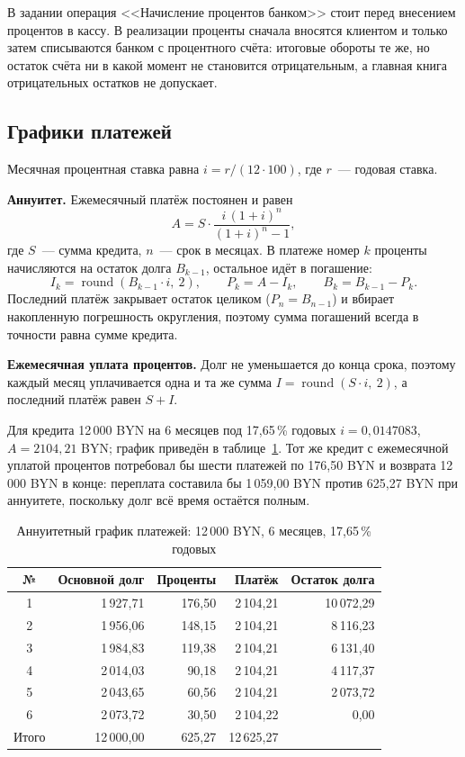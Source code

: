 \documentclass[14pt,a4paper]{extarticle}
\begin{document}
В задании операция <<Начисление процентов банком>> стоит перед внесением процентов в
кассу. В реализации проценты сначала вносятся клиентом и только затем списываются банком с
процентного счёта: итоговые обороты те же, но остаток счёта ни в какой момент не становится
отрицательным, а главная книга отрицательных остатков не допускает.

\subsection{Графики платежей}

Месячная процентная ставка равна $i = r / (12 \cdot 100)$, где $r$~--- годовая ставка.

\textbf{Аннуитет.} Ежемесячный платёж постоянен и равен
\begin{equation}
A = S \cdot \frac{i\,(1 + i)^n}{(1 + i)^n - 1},
\label{eq:annuity}
\end{equation}
где $S$~--- сумма кредита, $n$~--- срок в месяцах. В платеже номер $k$ проценты начисляются
на остаток долга $B_{k-1}$, остальное идёт в погашение:
\begin{equation}
I_k = \operatorname{round}(B_{k-1} \cdot i,\ 2), \qquad P_k = A - I_k, \qquad B_k = B_{k-1} - P_k .
\end{equation}
Последний платёж закрывает остаток целиком ($P_n = B_{n-1}$) и вбирает накопленную
погрешность округления, поэтому сумма погашений всегда в точности равна сумме кредита.

\textbf{Ежемесячная уплата процентов.} Долг не уменьшается до конца срока, поэтому каждый
месяц уплачивается одна и та же сумма $I = \operatorname{round}(S \cdot i,\ 2)$, а последний
платёж равен $S + I$.

Для кредита 12\,000 BYN на 6 месяцев под 17,65\,\% годовых $i = 0{,}0147083$,
$A = 2104{,}21$ BYN; график приведён в таблице~\ref{tab:schedule}. Тот же кредит с
ежемесячной уплатой процентов потребовал бы шести платежей по 176,50 BYN и возврата
12\,000 BYN в конце: переплата составила бы 1\,059,00 BYN против 625,27 BYN при аннуитете,
поскольку долг всё время остаётся полным.

\begin{table}[H]
\caption{Аннуитетный график платежей: 12\,000 BYN, 6 месяцев, 17,65\,\% годовых}
\label{tab:schedule}
\centering
\small
\begin{tabular}{crrrr}
\toprule
№ & Основной долг & Проценты & Платёж & Остаток долга \\
\midrule
1 & 1\,927,71 & 176,50 & 2\,104,21 & 10\,072,29 \\
2 & 1\,956,06 & 148,15 & 2\,104,21 & 8\,116,23 \\
3 & 1\,984,83 & 119,38 & 2\,104,21 & 6\,131,40 \\
4 & 2\,014,03 & 90,18 & 2\,104,21 & 4\,117,37 \\
5 & 2\,043,65 & 60,56 & 2\,104,21 & 2\,073,72 \\
6 & 2\,073,72 & 30,50 & 2\,104,22 & 0,00 \\
\midrule
Итого & 12\,000,00 & 625,27 & 12\,625,27 & \\
\bottomrule
\end{tabular}
\end{table}
\end{document}
